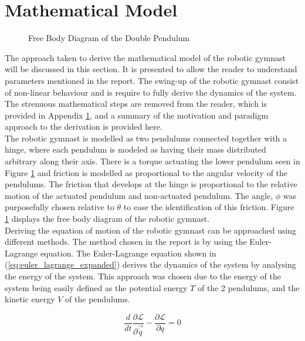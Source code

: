 \section{Mathematical Model}
\label{sec:math_model}
\begin{figure}[h]
	\centering
	
	\caption{Free Body Diagram of the Double Pendulum}
	\label{fig:doublePen}
\end{figure}

The approach taken to derive the mathematical model of the robotic gymnast will be discussed in this section. It is presented to allow the reader to understand parameters mentioned in the report. The swing-up of the robotic gymnast consist of non-linear behaviour and is require to fully derive the dynamics of the system. The strenuous mathematical steps are removed from the reader, which is provided in Appendix \ref{sec:math_model}, and a summary of the motivation and paradigm approach to the derivation is provided here.\\

The robotic gymnast is modelled as two pendulums connected together with a hinge, where each pendulum is modeled as having their mass distributed arbitrary along their axis. There is a torque actuating the lower pendulum seen in Figure \ref{fig:doublePen} and friction is modelled as proportional to the angular velocity of the pendulums. The friction that develops at the hinge is proportional to the relative motion of the actuated pendulum and non-actuated pendulum. The angle, $\phi$ was purposefully chosen relative to $\theta$ to ease the identification of this friction. Figure \ref{fig:doublePen} displays the free body diagram of the robotic gymnast.\\

Deriving the equation of motion of the robotic gymnast can be approached using different methods. The method chosen in the report is by using the Euler-Lagrange equation. The Euler-Lagrange equation shown in (\ref{eq:euler_lagrange_expanded}) derives the dynamics of the system by analysing the energy of the system.  This approach was chosen due to the energy of the system being easily defined as the potential energy $T$ of the 2 pendulums, and the kinetic energy $V$ of the pendulums.
 
\begin{equation} \label{eq:euler_lagrange_expanded}
\frac{d}{dt}\frac{\partial\mathcal{L}}{\partial\vec{\dot{q}}}-\frac{\partial\mathcal{L}}{\partial q} = 0
\end{equation}

